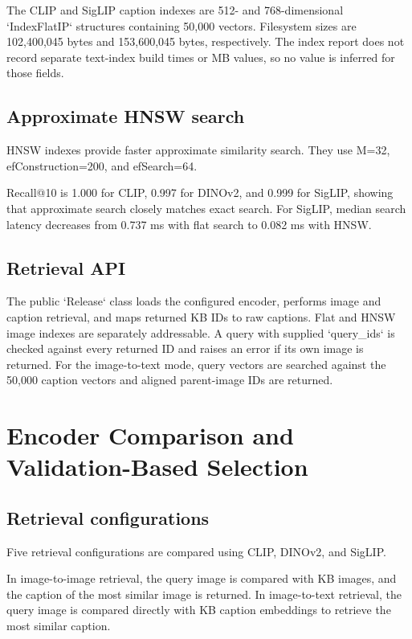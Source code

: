 \documentclass{article}
\begin{document}
The CLIP and SigLIP caption indexes are 512- and 768-dimensional
`IndexFlatIP` structures containing 50,000 vectors. Filesystem sizes are
102,400,045 bytes and 153,600,045 bytes, respectively. The index report
does not record separate text-index build times or MB values, so no
value is inferred for those fields.

\subsection{Approximate HNSW search}\label{approximate-hnsw-search}

HNSW indexes provide faster approximate similarity search.
They use M=32, efConstruction=200, and efSearch=64.

Recall@10 is 1.000 for CLIP, 0.997 for DINOv2, and 0.999 for
SigLIP, showing that approximate search closely matches exact
search. For SigLIP, median search latency decreases from 0.737 ms
with flat search to 0.082 ms with HNSW.

\subsection{Retrieval API}\label{retrieval-api}

The public `Release` class loads the configured encoder, performs image
and caption retrieval, and maps returned KB IDs to raw captions. Flat
and HNSW image indexes are separately addressable. A query with supplied
`query\_ids` is checked against every returned ID and raises an error if
its own image is returned. For the image-to-text mode, query vectors are
searched against the 50,000 caption vectors and aligned parent-image IDs
are returned.


\newpage

\section{Encoder Comparison and Validation-Based
Selection}\label{encoder-comparison-and-validation-based-selection}

\subsection{Retrieval
configurations}\label{retrieval-configurations}

Five retrieval configurations are compared using CLIP, DINOv2,
and SigLIP.

In image-to-image retrieval, the query image is compared with KB
images, and the caption of the most similar image is returned.
In image-to-text retrieval, the query image is compared directly
with KB caption embeddings to retrieve the most similar caption.
\end{document}
